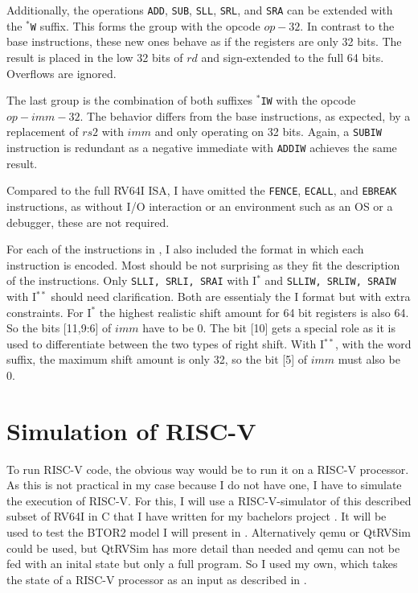 Additionally, the operations \texttt{ADD}, \texttt{SUB},
\texttt{SLL}, \texttt{SRL}, and \texttt{SRA} can be extended with the
\texttt{$^*$W} suffix. This forms the group with the opcode $op-32$.
In contrast to the base instructions, these new ones behave as if the
registers are only 32 bits. The result is placed in the low 32 bits
of $rd$ and sign-extended to the full 64 bits. Overflows are ignored.

The last group is the combination of both suffixes \texttt{$^*$IW}
with the opcode $op-imm-32$. The behavior differs from the base
instructions, as expected, by a replacement of $rs2$ with $imm$ and
only operating on 32 bits. Again, a \texttt{SUBIW} instruction is
redundant as a negative immediate with \texttt{ADDIW} achieves the
same result.

Compared to the full RV64I ISA, I have omitted the \texttt{FENCE},
\texttt{ECALL}, and \texttt{EBREAK} instructions, as without I/O
interaction or an environment such as an OS or a debugger, these are
not required.

For each of the instructions in , I also
included the format in which each instruction is encoded. Most should
be not surprising as they fit the description of the instructions.
Only \texttt{SLLI, SRLI, SRAI} with I$^*$ and \texttt{SLLIW, SRLIW,
      SRAIW} with I$^{**}$ should need clarification. Both are essentialy
the I format but with extra constraints. For I$^*$ the highest
realistic shift amount for 64 bit registers is also 64. So the bits
      [11,9:6] of $imm$ have to be 0. The bit [10] gets a special role as
it is used to differentiate between the two types of right shift.
With I$^{**}$, with the word suffix, the maximum shift amount is only
32, so the bit [5] of $imm$ must also be 0.

\section{Simulation of RISC-V}\label{sec:simulation}
To run RISC-V code, the obvious way would be to run it on a RISC-V
processor. As this is not practical in my case because I do not have
one, I have to simulate the execution of RISC-V. For this, I will use
a RISC-V-simulator of this described subset of RV64I in C that I have
written for my bachelors project \cite{repoSim}. It will be used to
test the BTOR2 model I will present in .
Alternatively qemu \cite{qemu} or QtRVSim \cite{qtrvsim} could be
used, but QtRVSim has more detail than needed and qemu can not be fed
with an inital state but only a full program. So I used my own, which
takes the state of a RISC-V processor as an input as described in
.

